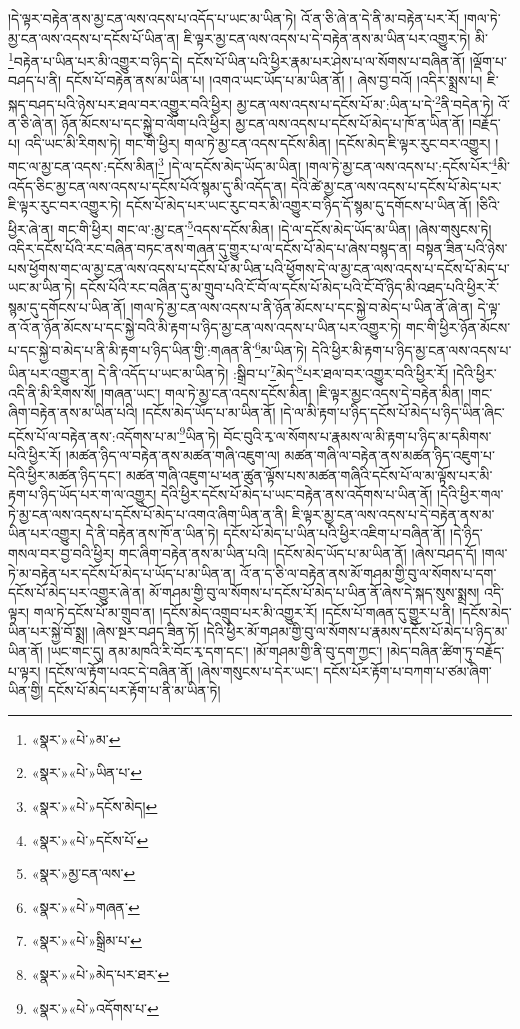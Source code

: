 །དེ་ལྟར་བརྟེན་ནས་མྱ་ངན་ལས་འདས་པ་འདོད་པ་ཡང་མ་ཡིན་ཏེ། འོ་ན་ཅི་ཞེ་ན་དེ་ནི་མ་བརྟེན་པར་རོ། །གལ་ཏེ་མྱ་ངན་ལས་འདས་པ་དངོས་པོ་ཡིན་ན། ཇི་ལྟར་མྱ་ངན་ལས་འདས་པ་དེ་བརྟེན་ནས་མ་ཡིན་པར་འགྱུར་ཏེ། མི་\footnote{«སྣར་»«པེ་»མ་}བརྟེན་པ་ཡིན་པར་མི་འགྱུར་བ་ཉིད་དེ། དངོས་པོ་ཡིན་པའི་ཕྱིར་རྣམ་པར་ཤེས་པ་ལ་སོགས་པ་བཞིན་ནོ། །ལྡོག་པ་བཤད་པ་ནི། དངོས་པོ་བརྟེན་ནས་མ་ཡིན་པ། །འགའ་ཡང་ཡོད་པ་མ་ཡིན་ནོ། །
ཞེས་བྱ་བའོ། །འདིར་སྨྲས་པ། ཇི་སྐད་བཤད་པའི་ཉེས་པར་ཐལ་བར་འགྱུར་བའི་ཕྱིར། མྱ་ངན་ལས་འདས་པ་དངོས་པོ་མ་:ཡིན་པ་དེ་\footnote{«སྣར་»«པེ་»ཡིན་པ་}ནི་བདེན་ཏེ། འོ་ན་ཅི་ཞེ་ན། ཉོན་མོངས་པ་དང་སྐྱེ་བ་ལོག་པའི་ཕྱིར། མྱ་ངན་ལས་འདས་པ་དངོས་པོ་མེད་པ་ཁོ་ན་ཡིན་ནོ། །བརྗོད་པ། འདི་ཡང་མི་རིགས་ཏེ། གང་གི་ཕྱིར། གལ་ཏེ་མྱ་ངན་འདས་དངོས་མིན། །དངོས་མེད་ཇི་ལྟར་རུང་བར་འགྱུར། །གང་ལ་མྱ་ངན་འདས་:དངོས་མིན།\footnote{«སྣར་»«པེ་»དངོས་མེད།} །དེ་ལ་དངོས་མེད་ཡོད་མ་ཡིན། །གལ་ཏེ་མྱ་ངན་ལས་འདས་པ་:དངོས་པོར་\footnote{«སྣར་»«པེ་»དངོས་པོ་}མི་འདོད་ཅིང་མྱ་ངན་ལས་འདས་པ་དངོས་པོའོ་སྙམ་དུ་མི་འདོད་ན། དེའི་ཚེ་མྱ་ངན་ལས་འདས་པ་དངོས་པོ་མེད་པར་ཇི་ལྟར་རུང་བར་འགྱུར་ཏེ། དངོས་པོ་མེད་པར་ཡང་རུང་བར་མི་འགྱུར་བ་ཉིད་དོ་སྙམ་དུ་དགོངས་པ་ཡིན་ནོ། །ཅིའི་ཕྱིར་ཞེ་ན། གང་གི་ཕྱིར། གང་ལ་:མྱ་ངན་\footnote{«སྣར་»མྱ་ངན་ལས་}འདས་དངོས་མིན། །དེ་ལ་དངོས་མེད་ཡོད་མ་ཡིན། །ཞེས་གསུངས་ཏེ། འདིར་དངོས་པོའི་རང་བཞིན་བཏང་ནས་གཞན་དུ་གྱུར་པ་ལ་དངོས་པོ་མེད་པ་ཞེས་བསྙད་ན། བསྟན་ཟིན་པའི་ཉེས་པས་ཕྱོགས་གང་ལ་མྱ་ངན་ལས་འདས་པ་དངོས་པོ་མ་ཡིན་པའི་ཕྱོགས་དེ་ལ་མྱ་ངན་ལས་འདས་པ་དངོས་པོ་མེད་པ་ཡང་མ་ཡིན་ཏེ། དངོས་པོའི་རང་བཞིན་དུ་མ་གྲུབ་པའི་ངོ་བོ་ལ་དངོས་པོ་མེད་པའི་ངོ་བོ་ཉིད་མི་འཐད་པའི་ཕྱིར་རོ་སྙམ་དུ་དགོངས་པ་ཡིན་ནོ། །གལ་ཏེ་མྱ་ངན་ལས་འདས་པ་ནི་ཉོན་མོངས་པ་དང་སྐྱེ་བ་མེད་པ་ཡིན་ནོ་ཞེ་ན། དེ་ལྟ་ན་འོ་ན་ཉོན་མོངས་པ་དང་སྐྱེ་བའི་མི་རྟག་པ་ཉིད་མྱ་ངན་ལས་འདས་པ་ཡིན་པར་འགྱུར་ཏེ། གང་གི་ཕྱིར་ཉོན་མོངས་པ་དང་སྐྱེ་བ་མེད་པ་ནི་མི་རྟག་པ་ཉིད་ཡིན་གྱི་:གཞན་ནི་\footnote{«སྣར་»«པེ་»གཞན་}མ་ཡིན་ཏེ། དེའི་ཕྱིར་མི་རྟག་པ་ཉིད་མྱ་ངན་ལས་འདས་པ་ཡིན་པར་འགྱུར་ན། དེ་ནི་འདོད་པ་ཡང་མ་ཡིན་ཏེ། :སྒྲིབ་པ་\footnote{«སྣར་»«པེ་»སྒྲིམ་པ་}མེད་\footnote{«སྣར་»«པེ་»མེད་པར་ཐར་}པར་ཐལ་བར་འགྱུར་བའི་ཕྱིར་རོ། །དེའི་ཕྱིར་འདི་ནི་མི་རིགས་སོ། །གཞན་ཡང་། གལ་ཏེ་མྱ་ངན་འདས་དངོས་མིན། །ཇི་ལྟར་མྱང་འདས་དེ་བརྟེན་མིན། །གང་ཞིག་བརྟེན་ནས་མ་ཡིན་པའི། །དངོས་མེད་ཡོད་པ་མ་ཡིན་ནོ། །དེ་ལ་མི་རྟག་པ་ཉིད་དངོས་པོ་མེད་པ་ཉིད་ཡིན་ཞིང་དངོས་པོ་ལ་བརྟེན་ནས་:འདོགས་པ་མ་\footnote{«སྣར་»«པེ་»འདོགས་པ་}ཡིན་ཏེ། བོང་བུའི་རྭ་ལ་སོགས་པ་རྣམས་ལ་མི་རྟག་པ་ཉིད་མ་དམིགས་པའི་ཕྱིར་རོ། །མཚན་ཉིད་ལ་བརྟེན་ནས་མཚན་གཞི་འཇུག་ལ། མཚན་གཞི་ལ་བརྟེན་ནས་མཚན་ཉིད་འཇུག་པ་དེའི་ཕྱིར་མཚན་ཉིད་དང་། མཚན་གཞི་འཇུག་པ་ཕན་ཚུན་ལྟོས་པས་མཚན་གཞིའི་དངོས་པོ་ལ་མ་ལྟོས་པར་མི་རྟག་པ་ཉིད་ཡོད་པར་ག་ལ་འགྱུར། དེའི་ཕྱིར་དངོས་པོ་མེད་པ་ཡང་བརྟེན་ནས་འདོགས་པ་ཡིན་ནོ། །དེའི་ཕྱིར་གལ་ཏེ་མྱ་ངན་ལས་འདས་པ་དངོས་པོ་མེད་པ་འགའ་ཞིག་ཡིན་ན་ནི། ཇི་ལྟར་མྱ་ངན་ལས་འདས་པ་དེ་བརྟེན་ནས་མ་ཡིན་པར་འགྱུར། དེ་ནི་བརྟེན་ནས་ཁོ་ན་ཡིན་ཏེ། དངོས་པོ་མེད་པ་ཡིན་པའི་ཕྱིར་འཇིག་པ་བཞིན་ནོ། །དེ་ཉིད་གསལ་བར་བྱ་བའི་ཕྱིར། གང་ཞིག་བརྟེན་ནས་མ་ཡིན་པའི། །དངོས་མེད་ཡོད་པ་མ་ཡིན་ནོ། །ཞེས་བཤད་དོ། །གལ་ཏེ་མ་བརྟེན་པར་དངོས་པོ་མེད་པ་ཡོད་པ་མ་ཡིན་ན། འོ་ན་ད་ཅི་ལ་བརྟེན་ནས་མོ་གཤམ་གྱི་བུ་ལ་སོགས་པ་དག་དངོས་པོ་མེད་པར་འགྱུར་ཞེ་ན། མོ་གཤམ་གྱི་བུ་ལ་སོགས་པ་དངོས་པོ་མེད་པ་ཡིན་ནོ་ཞེས་དེ་སྐད་སུས་སྨྲས། འདི་ལྟར། གལ་ཏེ་དངོས་པོ་མ་གྲུབ་ན། །དངོས་མེད་འགྲུབ་པར་མི་འགྱུར་རོ། །དངོས་པོ་གཞན་དུ་གྱུར་པ་ནི། །དངོས་མེད་ཡིན་པར་སྐྱེ་བོ་སྨྲ། །ཞེས་སྔར་བཤད་ཟིན་ཏོ། །དེའི་ཕྱིར་མོ་གཤམ་གྱི་བུ་ལ་སོགས་པ་རྣམས་དངོས་པོ་མེད་པ་ཉིད་མ་ཡིན་ནོ། །ཡང་གང་དུ། ནམ་མཁའི་རི་བོང་རྭ་དག་དང་། །མོ་གཤམ་གྱི་ནི་བུ་དག་ཀྱང་། །མེད་བཞིན་ཚིག་ཏུ་བརྗོད་པ་ལྟར། །དངོས་ལ་རྟོག་པའང་དེ་བཞིན་ནོ། །ཞེས་གསུངས་པ་དེར་ཡང་། དངོས་པོར་རྟོག་པ་བཀག་པ་ཙམ་ཞིག་ཡིན་གྱི། དངོས་པོ་མེད་པར་རྟོག་པ་ནི་མ་ཡིན་ཏེ། 